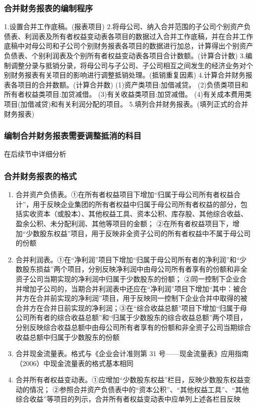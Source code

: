 \documentclass[UTF8,12pt]{ctexart}
\numberwithin{equation}{section} %
\numberwithin{figure}{section}
\numberwithin{table}{section}
\begin{document}
	\subsubsection{合并财务报表的编制程序}
	1.设置合并工作底稿。(报表项目)
	2.将母公司、纳入合并范围的子公司个别资产负债表、利润表及所有者权益变动表各项目的数据过入合并工作底稿，并在合并工作底稿中对母公司和子公司个别财务报表各项目的数据进行加总，计算得出个别资产负债表、个别利润表及个别所有者权益变动表各项目合计数额。(计算合计数)
	3.编制调整分录与抵销分录，将母公司与子公司、子公司相互之间发生的经济业务对个别财务报表有关项目的影响进行调整抵销处理。(抵销重复因素)
	4.计算合并财务报表各项目的合并数额。(计算合并数)
	(1)资产类项目:加借减贷。
	(2)负债类项目和所有者权益类项目:加贷减借。
	(3)有关收益类项目:加贷减借。
	(4)有关成本费用类项目(加借减贷)和有关利润分配的项目。
	5.填列合并财务报表。(填列正式的合并财务报表)
	\subsubsection{编制合并财务报表需要调整抵消的科目}
	在后续节中详细分析
	\subsubsection{合并财务报表的格式}
	\begin{enumerate}
		\item 合并资产负债表。①在所有者权益项目下增加“归属于母公司所有者权益合计”，用于反映企业集团的所有者权益中归属于母公司所有者权益的部分，包括实收资本（或股本）、其他权益工具、资本公积、库存股、其他综合收益、盈余公积、未分配利润、其他等项目的金额；
		②在所有者权益项目下，增加“少数股东权益”项目，用于反映非全资子公司的所有者权益中不属于母公司的份额
		
		\item 合并利润表。①在“净利润”项目下增加“归属于母公司所有者的净利润”和“少数股东损益”两个项目，分别反映净利润中由母公司所有者享有的份额和非全资子公司当期实现的净利润中归属于少数股东的份额；
		②同一控制下企业合并增加子公司的，当期合并利润表中还应在“净利润”项目下增加“其中：被合并方在合并前实现的净利润”项目，用于反映同一控制下企业合并中取得的被合并方在合并日前实现的净利润；③在“综合收益总额”项目下增加“归属于母公司所有者的综合收益总额”和“归属于少数股东的综合收益总额”两个项目，分别反映综合收益总额中由母公司所有者享有的份额和非全资子公司当期综合收益总额中归属于少数股东的份额
		
		\item 合并现金流量表。格式与《企业会计准则第 31 号——现金流量表》应用指南（2006）中现金流量表的格式基本相同
		
		\item 合并所有者权益变动表。①应增加“少数股东权益”栏目，反映少数股东权益变动的情况；
		②参照合并资产负债表中的“资本公积”、“其他权益工具”、“其他综合收益”等项目的列示，合并所有者权益变动表中应单列上述各栏目反映
		
	\end{enumerate}
\end{document}
